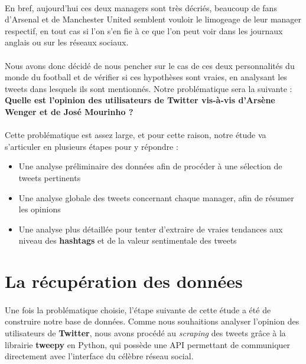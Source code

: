 \documentclass[14pt, openany]{article}
\begin{document}
\paragraph{}
En bref, aujourd'hui ces deux managers sont très décriés, beaucoup de fans d'Arsenal et de Manchester United semblent vouloir le limogeage de leur manager respectif, en tout cas si l'on s'en fie à ce que l'on peut voir dans les journaux anglais ou sur les réseaux sociaux.
\paragraph{}
Nous avons donc décidé de nous pencher sur le cas de ces deux personnalités du monde du football et de vérifier si ces hypothèses sont vraies, en analysant les tweets dans lesquels ils sont mentionnés. Notre problématique sera la suivante : \textbf{Quelle est l'opinion des utilisateurs de Twitter vis-à-vis d'Arsène Wenger et de José Mourinho ?}
\paragraph{}
Cette problématique est assez large, et pour cette raison, notre étude va s'articuler en plusieurs étapes pour y répondre :
\begin{itemize}
\item Une analyse préliminaire des données afin de procéder à une sélection de tweets pertinents
\item Une analyse globale des tweets concernant chaque manager, afin de résumer les opinions
\item Une analyse plus détaillée pour tenter d'extraire de vraies tendances aux niveau des \textbf{hashtags} et de la valeur sentimentale des tweets
\end{itemize}
\newpage
\section{La récupération des données}
\paragraph{}
Une fois la problématique choisie, l'étape suivante de cette étude a été de construire notre base de données. Comme nous souhaitions analyser l'opinion des utilisateurs de \textbf{Twitter}, nous avons procédé au \textit{scraping} des tweets grâce à la librairie \textbf{tweepy} en Python, qui possède une API permettant de communiquer directement avec l'interface du célèbre réseau social.
\end{document}
